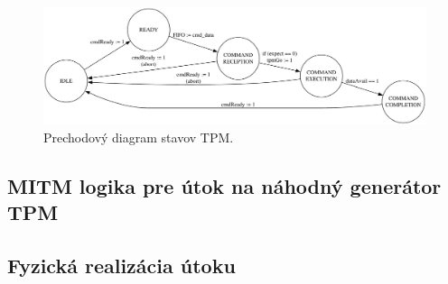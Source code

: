 \begin{figure}
    \centerline{\includegraphics[width=1\textwidth]{images/misc/tpmStateTransition.pdf}}
    \caption[Prechodový diagram stavov TPM]{Prechodový diagram stavov TPM.}
    \label{obr:tpmStateTransition}
\end{figure}

\subsection{MITM logika pre útok na náhodný generátor TPM}

\subsection{Fyzická realizácia útoku}